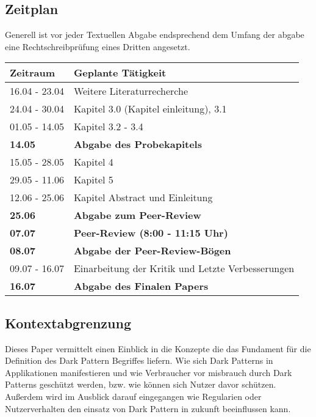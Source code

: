 \documentclass[conference,compsoc,final,a4paper]{IEEEtran}
\begin{document}
\subsection{Zeitplan}
Generell ist vor jeder Textuellen Abgabe endsprechend dem Umfang der abgabe eine Rechtschreibprüfung eines Dritten angesetzt.
\begin{table}[H]
\begin{tabular*}{\linewidth}{ @{\extracolsep{\fill}}l  l}
    \toprule
\textbf{Zeitraum}                   & \textbf{Geplante Tätigkeit}       \\
    \midrule
16.04 - 23.04                       & Weitere Literaturrecherche        \\
24.04 - 30.04                       & Kapitel 3.0 (Kapitel einleitung), 3.1                          \\
01.05 - 14.05                       & Kapitel 3.2 - 3.4                          \\
\textbf{14.05}                      & \textbf{Abgabe des Probekapitels} \\
15.05 - 28.05                       & Kapitel 4                           \\
29.05 - 11.06                       & Kapitel 5                          \\
12.06 - 25.06                       & Kapitel Abstract und Einleitung                          \\
\textbf{25.06}                      & \textbf{Abgabe zum Peer-Review}   \\
\textbf{07.07}                      & \textbf{Peer-Review (8:00 - 11:15 Uhr)} \\
\textbf{08.07}                      & \textbf{Abgabe der Peer-Review-Bögen}   \\
09.07 - 16.07                       & Einarbeitung der Kritik und Letzte Verbesserungen                           \\
\textbf{16.07}                      & \textbf{Abgabe des Finalen Papers}      \\
    \bottomrule
\end{tabular*}
\end{table}

\subsection{Kontextabgrenzung}
Dieses Paper vermittelt einen Einblick in die Konzepte die das Fundament für die Definition des Dark Pattern Begriffes liefern. Wie sich Dark Patterns in Applikationen manifestieren und wie Verbraucher vor misbrauch durch Dark Patterns geschützt werden, bzw. wie können sich Nutzer davor schützen. Außerdem wird im Ausblick darauf eingegangen wie Regularien oder Nutzerverhalten den einsatz von Dark Pattern in zukunft beeinflussen kann.
\end{document}
